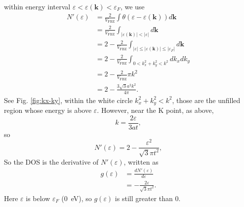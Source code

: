 \documentclass[12pt]{article}
\begin{document}
\begin{enumerate}[(a)]
          within energy interval $\varepsilon < \varepsilon(\bm{k}) < \varepsilon_F$,
          we use
          \begin{equation}
              \begin{split}
                  N'(\varepsilon) & = \frac{2}{V_{\text{FBZ}}}
                  \int \theta(\varepsilon - \varepsilon(\bm{k})) d\bm{k}                       \\
                                  & = \frac{2}{V_{\text{FBZ}}}
                  \int_{\lvert \varepsilon(\bm{k}) \rvert < \lvert \varepsilon \rvert} d\bm{k} \\
                                  & = 2 - \frac{2}{V_{\text{FBZ}}}
                  \int_{\lvert \varepsilon \rvert \leq \lvert \varepsilon(\bm{k}) \rvert \leq \lvert \varepsilon_F\rvert}
                  d\bm{k}                                                                      \\
                                  & = 2 - \frac{2}{V_{\text{FBZ}}}
                  \int_{0 < k_x^2 + k_y^2 < k^2} dk_x dk_y                                     \\
                                  & = 2 - \frac{2}{V_{\text{FBZ}}}\pi k^2                      \\
                                  & = 2 - \frac{3 \sqrt{3} a^2 k^2}{4 \pi }.
              \end{split}
          \end{equation}
          See Fig. \ref{fig:kx-ky}, within the white circle $k_x^2 + k_y^2 < k^2$,
          those are the unfilled region whose energy is above $\varepsilon$.
          However, near the $\mathrm{K}$ point, as above,
          \begin{equation}
              k = \frac{2\varepsilon}{3 a t},
          \end{equation}
          so
          \begin{equation}
              N'(\varepsilon) = 2 - \frac{\varepsilon^2}{\sqrt{3}\pi t^2},
          \end{equation}
          So the DOS is the derivative of $N'(\varepsilon)$, written as
          \begin{equation}
              \begin{split}
                  g(\varepsilon) & = \frac{dN'(\varepsilon)}{d\varepsilon}      \\
                                 & = - \frac{2 \varepsilon}{\sqrt{3} \pi  t^2}.
              \end{split}
          \end{equation}
          Here $\varepsilon$ is below $\varepsilon_F$ (\SI{0}{\electronvolt}), so $g(\varepsilon)$ is
          still greater than $0$.
\end{enumerate}
\end{document}
